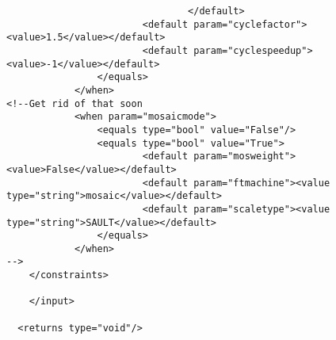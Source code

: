 \begin{verbatim}
                                </default>
                        <default param="cyclefactor"><value>1.5</value></default>
                        <default param="cyclespeedup"><value>-1</value></default>
                </equals>
            </when>
<!--Get rid of that soon
            <when param="mosaicmode">
                <equals type="bool" value="False"/>
                <equals type="bool" value="True">
                        <default param="mosweight"><value>False</value></default>
                        <default param="ftmachine"><value type="string">mosaic</value></default>
                        <default param="scaletype"><value type="string">SAULT</value></default>
                </equals>
            </when>
-->
    </constraints>

    </input>

  <returns type="void"/>
\end{verbatim}
